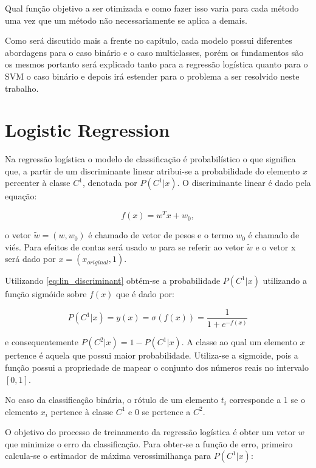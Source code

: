 Qual função objetivo a ser otimizada e como fazer isso varia para cada método uma vez que
um método não necessariamente se aplica a demais.

Como será discutido mais a frente no capítulo, cada modelo possui diferentes abordagens para o
caso binário e o caso multiclasses, porém os fundamentos são os mesmos portanto será explicado
tanto para a regressão logística quanto para o SVM o caso binário e depois irá estender para
o problema a ser resolvido neste trabalho.


\section{Logistic Regression}
\label{sec:logreg} 

Na regressão logística o modelo de classificação é probabilístico o que significa
que, a partir de um discriminante linear atribui-se a probabilidade do
elemento $x$ percenter à classe $C^1$, denotada por $P(C^1 | x)$. O discriminante
linear é dado pela equação: 
\begin{center}
	\begin{equation}
		\label{eq:lin_discriminant}
		f(x) = w^Tx + w_0,
	\end{equation}
\end{center}
o vetor $\tilde{w} = (w, w_0)$
é chamado de vetor de pesos e o termo $w_0$ é chamado de viés.
Para efeitos de contas
será usado $w$ para se referir ao vetor $\tilde{w}$ e o vetor x será dado por $x = (x_{original}, 1)$.

Utilizando \ref{eq:lin_discriminant} obtém-se a probabilidade $P(C^1 | x)$ utilizando a função sigmóide
sobre $f(x)$ que é dado por:

\begin{center}
	\begin{equation}
		\label{eq:sigmoid_y}
		P(C^1 | x) = y(x) = \sigma(f(x)) = \frac{1}{1 + e^{-f(x)}}
	\end{equation}
\end{center}
e consequentemente $P(C^2 | x) = 1 - P(C^1 | x)$.
A classe ao qual um elemento $x$ pertence é aquela que possui maior probabilidade. Utiliza-se
a sigmoide, pois a função possui a propriedade de mapear o conjunto dos números reais no intervalo
$[0, 1]$.

No caso da classificação binária, o rótulo de um elemento $t_i$ corresponde a 1 se o elemento $x_i$
pertence à classe $C^1$ e 0 se pertence a $C^2$.

O objetivo do processo de treinamento da regressão logística é obter um vetor $w$ que minimize
o erro da classificação. Para obter-se a função de erro, primeiro calcula-se o estimador
de máxima verossimilhança para $P(C^1 | x)$:

